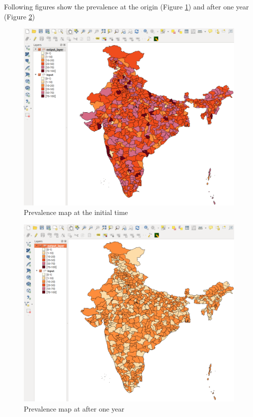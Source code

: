\documentclass[12pt,oneside]{memoir}
\begin{document}
Following figures show the prevalence at the origin (Figure \ref{outputsth0}) and after one year (Figure \ref{outputsth1})
\begin{figure}[H]
\centering
\includegraphics[scale=0.3]{outputsth0} 
\caption{Prevalence map at the initial time} 
\label{outputsth0}
\end{figure}

\begin{figure}[H]
\centering
\includegraphics[scale=0.3]{outputsth1} 
\caption{Prevalence map at after one year} 
\label{outputsth1}
\end{figure}
\end{document}
